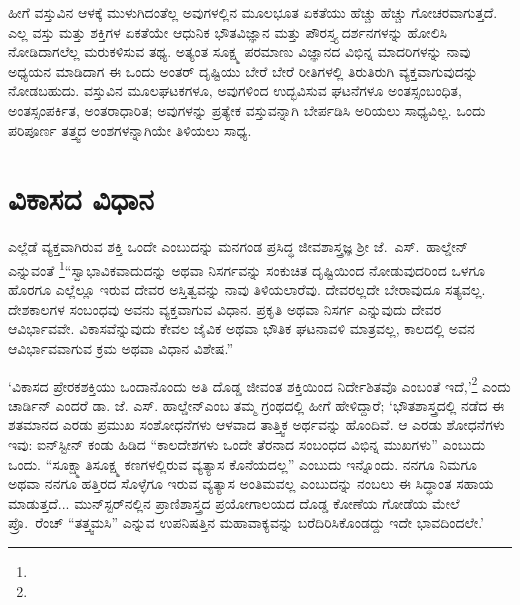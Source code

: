 ಹೀಗೆ ವಸ್ತುವಿನ ಆಳಕ್ಕೆ ಮುಳುಗಿದಂತೆಲ್ಲ ಅವುಗಳಲ್ಲಿನ ಮೂಲಭೂತ ಏಕತೆಯು ಹೆಚ್ಚು ಹೆಚ್ಚು ಗೋಚರವಾಗುತ್ತದೆ. ಎಲ್ಲ ವಸ್ತು ಮತ್ತು ಶಕ್ತಿಗಳ ಏಕತೆಯೇ ಆಧುನಿಕ ಭೌತವಿಜ್ಞಾನ ಮತ್ತು ಪೌರಸ್ತ್ಯ ದರ್ಶನಗಳನ್ನು ಹೋಲಿಸಿ ನೋಡಿದಾಗಲೆಲ್ಲ ಮರುಕಳಿಸುವ ತಥ್ಯ. ಅತ್ಯಂತ ಸೂಕ್ಷ್ಮ ಪರಮಾಣು ವಿಜ್ಞಾನದ ವಿಭಿನ್ನ ಮಾದರಿಗಳನ್ನು ನಾವು ಅಧ್ಯಯನ ಮಾಡಿದಾಗ ಈ ಒಂದು ಅಂತರ್ ದೃಷ್ಟಿಯು ಬೇರೆ ಬೇರೆ ರೀತಿಗಳಲ್ಲಿ ತಿರುತಿರುಗಿ ವ್ಯಕ್ತವಾಗುವುದನ್ನು ನೋಡಬಹುದು. ವಸ್ತುವಿನ ಮೂಲಘಟಕಗಳೂ, ಅವುಗಳಿಂದ ಉದ್ಭವಿಸುವ ಘಟನೆಗಳೂ ಅಂತಸ್ಸಂಬಂಧಿತ, ಅಂತ\-ಸ್ಸಂಪರ್ಕಿತ, ಅಂತರಾಧಾರಿತ; ಅವುಗಳನ್ನು ಪ್ರತ್ಯೇಕ ವಸ್ತುವನ್ನಾಗಿ ಬೇರ್ಪಡಿಸಿ ಅರಿಯಲು ಸಾಧ್ಯವಿಲ್ಲ. ಒಂದು ಪರಿಪೂರ್ಣ ತತ್ತ್ವದ ಅಂಶಗಳನ್ನಾಗಿಯೇ ತಿಳಿಯಲು ಸಾಧ್ಯ.


\section*{ವಿಕಾಸದ ವಿಧಾನ}


ಎಲ್ಲೆಡೆ ವ್ಯಕ್ತವಾಗಿರುವ ಶಕ್ತಿ ಒಂದೇ ಎಂಬುದನ್ನು ಮನಗಂಡ ಪ್ರಸಿದ್ಧ ಜೀವಶಾಸ್ತ್ರಜ್ಞ ಶ‍್ರೀ ಜೆ.\ ಎಸ್.\ ಹಾಲ್ಡೇನ್​ ಎನ್ನುವಂತೆ \footnote{\hfill{}}“ಸ್ವಾಭಾವಿಕವಾದುದನ್ನು ಅಥವಾ ನಿಸರ್ಗವನ್ನು ಸಂಕುಚಿತ ದೃಷ್ಟಿಯಿಂದ ನೋಡುವುದರಿಂದ ಒಳಗೂ ಹೊರಗೂ ಎಲ್ಲೆಲ್ಲೂ ಇರುವ ದೇವರ ಅಸ್ತಿತ್ವವನ್ನು ನಾವು ತಿಳಿಯಲಾರೆವು. ದೇವರಲ್ಲದೇ ಬೇರಾವುದೂ ಸತ್ಯವಲ್ಲ. ದೇಶಕಾಲಗಳ ಸಂಬಂಧವು ಅವನು ವ್ಯಕ್ತವಾಗುವ ವಿಧಾನ. ಪ್ರಕೃತಿ ಅಥವಾ ನಿಸರ್ಗ ಎನ್ನುವುದು ದೇವರ ಆವಿರ್ಭಾವವೇ. ವಿಕಾಸವೆನ್ನುವುದು ಕೇವಲ ಜೈವಿಕ ಅಥವಾ ಭೌತಿಕ ಘಟನಾವಳಿ ಮಾತ್ರವಲ್ಲ, ಕಾಲದಲ್ಲಿ ಅವನ ಆವಿರ್ಭಾವವಾಗುವ ಕ್ರಮ ಅಥವಾ ವಿಧಾನ ವಿಶೇಷ.”

‘ವಿಕಾಸದ ಪ್ರೇರಕಶಕ್ತಿಯು ಒಂದಾನೊಂದು ಅತಿ ದೊಡ್ಡ ಜೀವಂತ ಶಕ್ತಿಯಿಂದ ನಿರ್ದೇಶಿತವೊ ಎಂಬಂತೆ ಇದೆ,’\footnote{\hfill\hbox{}} ಎಂದು ಚಾರ್ಡಿನ್ ಎಂದರೆ ಡಾ. ಜೆ. ಎಸ್. ಹಾಲ್ಡೇನ್​ ಎಂಬ ತಮ್ಮ ಗ್ರಂಥದಲ್ಲಿ ಹೀಗೆ ಹೇಳಿದ್ದಾರೆ; ‘ಭೌತಶಾಸ್ತ್ರದಲ್ಲಿ ನಡೆದ ಈ ಶತಮಾನದ ಎರಡು ಪ್ರಮುಖ ಸಂಶೋಧನೆಗಳು ಆಳವಾದ ತಾತ್ತ್ವಿಕ ಅರ್ಥವನ್ನು ಹೊಂದಿವೆ. ಆ ಎರಡು ಶೋಧನೆಗಳು ಇವು: ಐನ್​ಸ್ಟೀನ್ ಕಂಡು ಹಿಡಿದ “ಕಾಲದೇಶಗಳು ಒಂದೇ ತೆರನಾದ ಸಂಬಂಧದ ವಿಭಿನ್ನ ಮುಖಗಳು” ಎಂಬುದು ಒಂದು. “ಸೂಕ್ಷ್ಮಾತಿಸೂಕ್ಷ್ಮ ಕಣಗಳಲ್ಲಿರುವ ವ್ಯತ್ಯಾಸ ಕೊನೆಯದಲ್ಲ” ಎಂಬುದು ಇನ್ನೊಂದು. ನನಗೂ ನಿಮಗೂ ಅಥವಾ ನನಗೂ ಹತ್ತಿರದ ಸೊಳ್ಳೆಗೂ ಇರುವ ವ್ಯತ್ಯಾಸ ಅಂತಿಮವಲ್ಲ ಎಂಬುದನ್ನು ನಂಬಲು ಈ ಸಿದ್ಧಾಂತ ಸಹಾಯ ಮಾಡುತ್ತದೆ... ಮುನ್​ಸ್ಟರ್​ನಲ್ಲಿನ ಪ್ರಾಣಿಶಾಸ್ತ್ರದ ಪ್ರಯೋಗಾಲಯದ ದೊಡ್ಡ ಕೋಣೆಯ ಗೋಡೆಯ ಮೇಲೆ ಪ್ರೊ.\ ರೆಂಚ್ “ತತ್ತ್ವಮಸಿ” ಎನ್ನುವ ಉಪನಿಷತ್ತಿನ ಮಹಾವಾಕ್ಯವನ್ನು ಬರೆದಿರಿಸಿಕೊಂಡದ್ದು ಇದೇ ಭಾವದಿಂದಲೇ.’

